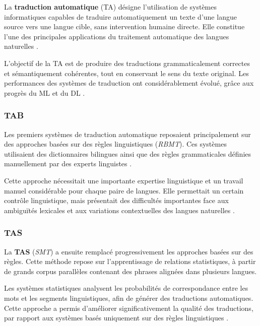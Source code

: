 La \textbf{traduction automatique} (\ac{TA}) désigne l'utilisation de systèmes informatiques capables de traduire automatiquement un texte d'une langue source vers une langue cible, sans intervention humaine directe. Elle constitue l'une des principales applications du traitement automatique des langues naturelles \cite{ranathunga2023neural}.

L'objectif de la \ac{TA} est de produire des traductions grammaticalement correctes et sémantiquement cohérentes, tout en conservant le sens du texte original. Les performances des systèmes de traduction ont considérablement évolué, grâce aux progrès du \ac{ML} et du \ac{DL} \cite{vaswani2017attention}.

\subsubsection{\ac{TAB}}

Les premiers systèmes de traduction automatique reposaient principalement sur des approches basées sur des règles linguistiques (\textit{\ac{RBMT}}). Ces systèmes utilisaient des dictionnaires bilingues ainsi que des règles grammaticales définies manuellement par des experts linguistes \cite{ranathunga2023neural}.

Cette approche nécessitait une importante expertise linguistique et un travail manuel considérable pour chaque paire de langues. Elle permettait un certain contrôle linguistique, mais présentait des difficultés importantes face aux ambiguïtés lexicales et aux variations contextuelles des langues naturelles \cite{dundjer2020automatic}.

\subsubsection{\ac{TAS}}

La \textbf{\ac{TAS}} (\textit{\ac{SMT}}) a ensuite remplacé progressivement les approches basées sur des règles. Cette méthode repose sur l'apprentissage de relations statistiques, à partir de grands corpus parallèles contenant des phrases alignées dans plusieurs langues.

Les systèmes statistiques analysent les probabilités de correspondance entre les mots et les segments linguistiques, afin de générer des traductions automatiques. Cette approche a permis d'améliorer significativement la qualité des traductions, par rapport aux systèmes basés uniquement sur des règles linguistiques \cite{ahmadnia2018neural}.

